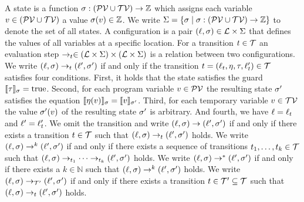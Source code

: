 \begin{definition}[Evaluation] 
  A state is a function $\sigma: (\mathcal{PV} \cup \mathcal{TV}) \rightarrow \mathbb{Z}$ which assigns each variable $v \in (\mathcal{PV} \cup \mathcal{TV})$ a value $\sigma(v) \in \mathbb{Z}$.
  We write $\Sigma = \lbrace  \sigma \mid \sigma: (\mathcal{PV} \cup \mathcal{TV}) \rightarrow \mathbb{Z} \rbrace$ to denote the set of all states.
  A configuration is a pair $(\ell, \sigma) \in \mathcal{L} \times \Sigma$ that defines the values of all variables at a specific location.
  For a transition $t \in \mathcal{T}$ an evaluation step $\rightarrow_t \in (\mathcal{L} \times \Sigma) \times (\mathcal{L} \times \Sigma)$ is a relation between two configurations.
  We write $(\ell, \sigma) \rightarrow_t (\ell', \sigma')$ if and only if the transition $t = (\ell_t, \eta, \tau, \ell_t') \in \mathcal{T}$ satisfies four conditions.
  First, it holds that the state satisfies the guard $\llbracket \tau \rrbracket_{\sigma} = \text{true}$.
  Second, for each program variable $v \in \mathcal{PV}$ the resulting state $\sigma'$ satisfies the equation $\llbracket \eta(v) \rrbracket_{\sigma} = \llbracket v \rrbracket_{\sigma'}$.
  Third, for each temporary variable $v \in \mathcal{TV}$ the value $\sigma'(v)$ of the resulting state $\sigma'$ is arbitrary.
  And fourth, we have $\ell = \ell_t$ and $\ell' = \ell_t'$.
  We omit the transition and write $(\ell, \sigma) \rightarrow (\ell', \sigma')$ if and only if there exists a transition $t \in \mathcal{T}$ such that $(\ell, \sigma) \rightarrow_t (\ell', \sigma')$ holds.
  We write $(\ell, \sigma) \rightarrow^k (\ell', \sigma')$ if and only if there exists a sequence of transitions $t_1, \dots, t_k \in \mathcal{T}$ such that $(\ell, \sigma) \rightarrow_{t_1} \dots \rightarrow_{t_k} (\ell', \sigma')$ holds.
  We write $(\ell, \sigma) \rightarrow^* (\ell', \sigma')$ if and only if there exists a $k \in \mathbb{N}$ such that $(\ell, \sigma) \rightarrow^k (\ell', \sigma')$ holds.
  We write $(\ell, \sigma) \rightarrow_{\mathcal{T}'} (\ell', \sigma')$ if and only if there exists a transition $t \in \mathcal{T}' \subseteq \mathcal{T}$ such that $(\ell, \sigma) \rightarrow_t (\ell', \sigma')$ holds.
\end{definition}


